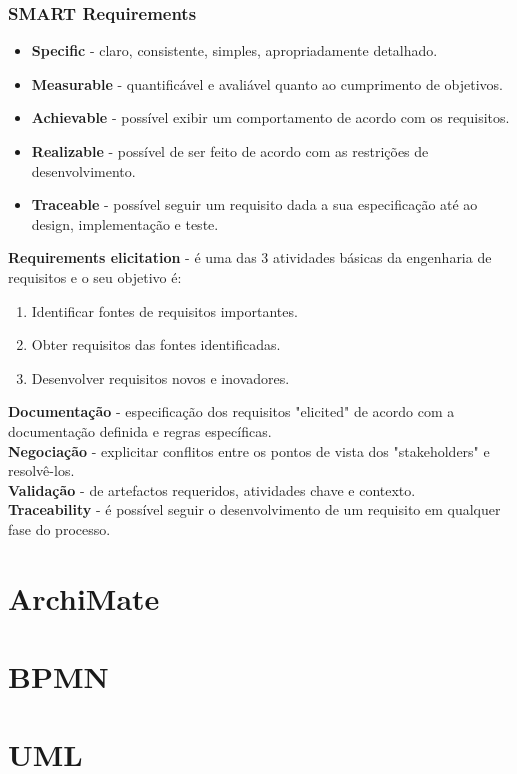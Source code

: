 \documentclass[12pt]{article}
\begin{document}
\subsubsection*{SMART Requirements}

\begin{itemize}
    \item \textbf{Specific} - claro, consistente, simples, apropriadamente detalhado.
    \item \textbf{Measurable} - quantificável e avaliável quanto ao cumprimento de objetivos.
    \item \textbf{Achievable} - possível exibir um comportamento de acordo com os requisitos.
    \item \textbf{Realizable} - possível de ser feito de acordo com as restrições de desenvolvimento.
    \item \textbf{Traceable} - possível seguir um requisito dada a sua especificação até ao design, implementação e teste.  
\end{itemize}

\textbf{Requirements elicitation} - é uma das 3 atividades básicas da engenharia de requisitos e o seu objetivo é:
\begin{enumerate}[topsep=0pt, itemsep=0pt]
    \item Identificar fontes de requisitos importantes.
    \item Obter requisitos das fontes identificadas.
    \item Desenvolver requisitos novos e inovadores.
\end{enumerate}

\textbf{Documentação} - especificação dos requisitos "elicited" de acordo com a documentação definida e regras específicas.
\\[6pt]
\textbf{Negociação} - explicitar conflitos entre os pontos de vista dos "stakeholders" e resolvê-los.
\\[6pt]
\textbf{Validação} - de artefactos requeridos, atividades chave e contexto.
\\[6pt]
\textbf{Traceability} - é possível seguir o desenvolvimento de um requisito em qualquer fase do processo.

\newpage

\section{ArchiMate}



\newpage

\section{BPMN}



\newpage

\section{UML}
\end{document}
